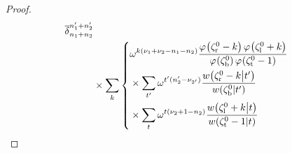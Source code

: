 \documentclass{sl2ams}
\numberwithin{equation}{section}
\begin{document}
\begin{proof}
\begin{equation}
\begin{aligned}
    \nrdel{n_1 + n_2}{n_1' +  n_2'}
    \\
    &\times
    \sum_{k}
    \left\{
    \begin{aligned}
      &
      \omega^{k(\nu_{1} + \nu_{2} - n_1 - n_2)}
      \frac{
        \pf{\zeta_{\lN}^0 - k}
        \pf{\zeta_{\lS}^0 + k}
        }{
          \pf{\zeta_{\lE}^0}
          \pf{\zeta_{\lW}^0 - 1 }
      }
      \\
      &\times
      \sum_{t'}
      \omega^{t'(n_2' - \nu_{2'})}
      \frac{
        \qlog{\zeta_{\lN}^0 - k}{t'}
        }{
        \qlog{\zeta_{\lE}^0}{t'}
      }
      \\
      &\times
      \sum_{t}
      \omega^{t(\nu_2 + 1 - n_2)}
      \frac{
        \qlog{\zeta_{\lS}^0 + k}{t}
        }{
        \qlog{\zeta_{\lW}^0 - 1}{t}
      }
    \end{aligned}
    \right.
  \end{aligned}
\end{equation}


\end{proof}
\end{document}
